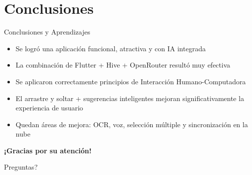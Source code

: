 \documentclass[10pt, aspectratio=169]{beamer}
\begin{document}
\section{Conclusiones}
\begin{frame}{Conclusiones y Aprendizajes}
    \begin{itemize}
        \item Se logró una aplicación funcional, atractiva y con IA integrada
        \item La combinación de Flutter + Hive + OpenRouter resultó muy efectiva
        \item Se aplicaron correctamente principios de Interacción Humano-Computadora
        \item El arrastre y soltar + sugerencias inteligentes mejoran significativamente la experiencia de usuario
        \item Quedan áreas de mejora: OCR, voz, selección múltiple y sincronización en la nube
    \end{itemize}
    
    \vspace{1.5em}
    \centering
    {\Large \textbf{¡Gracias por su atención!}}
    
    \vspace{0.5em}
    Preguntas?
\end{frame}
\end{document}
